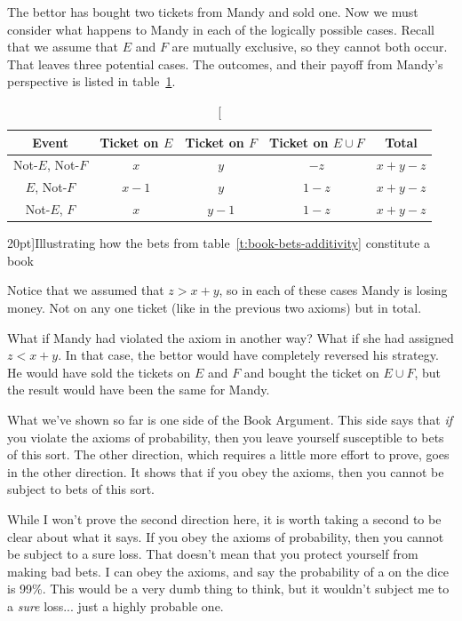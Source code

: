 The bettor has bought two tickets from Mandy and sold one.  Now we must consider what happens to Mandy in each of the logically possible cases. Recall that we assume that $E$ and $F$ are mutually exclusive, so they cannot both occur.  That leaves three potential cases. The outcomes, and their payoff from Mandy's perspective is listed in table~\ref{t:book-outcomes}.

\begin{table}[h!]
\centering
\begin{tabular}{ccccc}
\toprule
Event             & Ticket on $E$ & Ticket on $F$ & Ticket on $E\cup F$ & Total \\
\midrule
Not-$E$, Not-$F$  & $x$           & $y$           & $-z$                & $x + y - z$ \\
$E$, Not-$F$      & $x - 1$       & $y$           & $1 - z$             & $x + y - z$ \\
Not-$E$, $F$      & $x$           & $y - 1$       & $1 - z$             & $x + y - z$ \\
\bottomrule
\end{tabular}
\label{t:book-outcomes}
\caption[][20pt]{Illustrating how the bets from table~\ref{t:book-bets-additivity} constitute a book}
\end{table}


Notice that we assumed that $z > x + y$, so in each of these cases Mandy is losing money.  Not on any one ticket (like in the previous two axioms) but in total.

What if Mandy had violated the axiom in another way?  What if she had assigned $z < x + y$.  In that case, the bettor would have completely reversed his strategy.  He would have sold the tickets on $E$ and $F$ and bought the ticket on $E \cup F$, but the result would have been the same for Mandy.

What we've shown so far is one side of the Book Argument.  This side says that {\it if} you violate the axioms of probability, then you leave yourself susceptible to bets of this sort.  The other direction, which requires a little more effort to prove, goes in the other direction. It shows that if you obey the axioms, then you cannot be subject to bets of this sort.

While I won't prove the second direction here, it is worth taking a second to be clear about what it says.  If you obey the axioms of probability, then you cannot be subject to a sure loss.  That doesn't mean that you protect yourself from making bad bets.  I can obey the axioms, and say the probability of a  on the dice is 99\%.  This would be a very dumb thing to think, but it wouldn't subject me to a {\it sure} loss... just a highly probable one.

